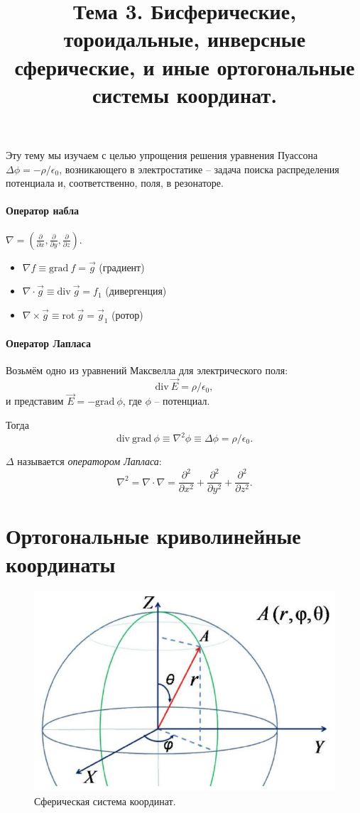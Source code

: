 \documentclass[12pt]{report}
\title{Тема 3. Бисферические, тороидальные, инверсные сферические, и иные ортогональные системы координат.}
\renewcommand{\div}{\mathrm{div~}}
\newcommand{\grad}{\mathrm{grad~}}
\newcommand{\rot}{\mathrm{rot~}}
\begin{document}
	\maketitle
	
Эту тему мы изучаем с целью упрощения решения уравнения Пуассона $\Delta\phi = -\rho/\epsilon_0$, возникающего в электростатике -- задача поиска распределения потенциала и, соответственно, поля, в резонаторе.

\paragraph{Оператор набла} $\nabla = (\frac{\partial}{\partial x}, \frac{\partial}{\partial y}, \frac{\partial}{\partial z})$.
\begin{itemize}
	\item $\nabla f \equiv \grad f = \vec g$ (градиент)
	\item $\nabla\cdot\vec g \equiv \div\vec g = f_1$ (дивергенция)
	\item $\nabla\times\vec g \equiv \rot\vec g = \vec g_1$ (ротор)
\end{itemize}

\paragraph{Оператор Лапласа}
Возьмём одно из уравнений Максвелла для электрического поля:
\[
\div \vec E = \rho/\epsilon_0,
\]
и представим $\vec E = -\grad \phi$, где $\phi$ -- потенциал.

Тогда
\[
\div\grad\phi \equiv \nabla^2 \phi \equiv \Delta\phi = \rho/\epsilon_0.
\]

$\Delta$ называется \emph{оператором Лапласа}:
\[
\nabla^2 = \nabla\cdot\nabla = \frac{\partial^2}{\partial x^2} + \frac{\partial^2}{\partial y^2} + \frac{\partial^2}{\partial z^2}.
\]


\section{Ортогональные криволинейные координаты}
\begin{figure}[h!]\centering
	\includegraphics[width=\linewidth]{spherical_cs}
	\caption{Сферическая система координат.\label{fig:spherical_cs}}
\end{figure}
\end{document}

